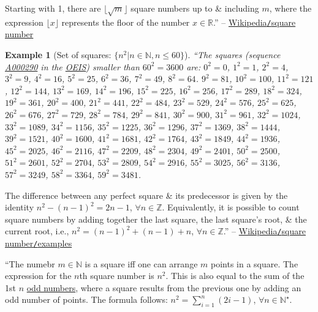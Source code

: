 \documentclass{article}
\newtheorem{example}{Example}
\begin{document}
Starting with 1, there are $\lfloor\sqrt{m}\rfloor$ square numbers up to \& including $m$, where the expression $\lfloor x\rfloor$ represents the floor of the number $x\in\mathbb{R}$.'' -- \href{https://en.wikipedia.org/wiki/Square_number}{Wikipedia{\tt /}square number}

\begin{example}[Set of squares: $\{n^2|n\in\mathbb{N},n\le60\}$]
	``The squares (sequence \href{https://oeis.org/A000290}{A000290} in the \href{https://en.wikipedia.org/wiki/On-Line_Encyclopedia_of_Integer_Sequences}{OEIS}) smaller than $60^2 = 3600$ are: $0^2 = 0$, $1^2 = 1$, $2^2 = 4$, $3^2 = 9$, $4^2 = 16$, $5^2 = 25$, $6^2 = 36$, $7^2 = 49$, $8^2 = 64$. $9^2 = 81$, $10^2 = 100$, $11^2 = 121$, $12^2 = 144$, $13^2 = 169$, $14^2 = 196$, $15^2 = 225$, $16^2 = 256$, $17^2 = 289$, $18^2 = 324$, $19^2 = 361$, $20^2 = 400$, $21^2 = 441$, $22^2 = 484$, $23^2 = 529$, $24^2 = 576$, $25^2 = 625$, $26^2 =  676$, $27^2 = 729$, $28^2 = 784$, $29^2 = 841$, $30^2 = 900$, $31^2 = 961$, $32^2 = 1024$, $33^2 = 1089$, $34^2 = 1156$, $35^2 = 1225$, $36^2 = 1296$, $37^2 = 1369$, $38^2 = 1444$, $39^2 = 1521$, $40^2 = 1600$, $41^2 = 1681$, $42^2 = 1764$, $43^2 = 1849$, $44^2 = 1936$, $45^2 = 2025$, $46^2 = 2116$, $47^2 = 2209$, $48^2 = 2304$, $49^2 = 2401$, $50^2 = 2500$, $51^2 = 2601$, $52^2 = 2704$, $53^2 = 2809$, $54^2 = 2916$, $55^2 = 3025$, $56^2 = 3136$, $57^2 = 3249$, $58^2 = 3364$, $59^2 = 3481$.
\end{example}
The difference between any perfect square \& its predecessor is given by the identity $n^2 - (n - 1)^2 = 2n - 1$, $\forall n\in\mathbb{Z}$. Equivalently, it is possible to count square numbers by adding together the last square, the last square's root, \& the current root, i.e., $n^2 = (n - 1)^2 + (n - 1) + n$, $\forall n\in\mathbb{Z}$.'' -- \href{https://en.wikipedia.org/wiki/Square_number#Examples}{Wikipedia{\tt /}square number{\tt /}examples}

``The numebr $m\in\mathbb{N}$ is a square iff one can arrange $m$ points in a square. The expression for the $n$th square number is $n^2$. This is also equal to the sum of the 1st $n$ \href{https://en.wikipedia.org/wiki/Parity_(mathematics)}{odd numbers}, where a square results from the previous one by adding an odd number of points. The formula follows: $n^2 = \sum_{i=1}^n (2i - 1)$, $\forall n\in\mathbb{N}^\star$.
\end{document}
